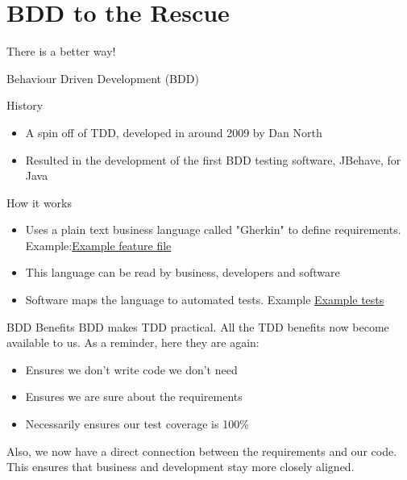 \documentclass[bigger]{beamer}
\begin{document}
\section{BDD to the Rescue}
\label{sec:org1af5abd}
\begin{frame}[label={sec:orgaa58640}]{There is a better way!}
\begin{block}{Behaviour Driven Development (BDD)}
\begin{block}{History}
\begin{itemize}
\item A spin off of TDD, developed in around 2009 by Dan North
\item Resulted in the development of the first BDD testing software, JBehave, for Java
\end{itemize}
\end{block}
\begin{block}{How it works}
\begin{itemize}
\item Uses a plain text business language called "Gherkin" to define requirements. Example:\href{calculator/arithmetic/features/arithmetic.feature}{Example feature file}
\item This language can be read by business, developers and software
\item Software maps the language to automated tests. Example \href{possible\_solution/tests.py}{Example tests}
\end{itemize}
\end{block}
\end{block}
\end{frame}
\begin{frame}[label={sec:orgc275b70}]{BDD Benefits}
BDD makes TDD practical. All the TDD benefits now become available to us.
As a reminder, here they are again:
\begin{itemize}
\item Ensures we don't write code we don't need
\item Ensures we are sure about the requirements
\item Necessarily ensures our test coverage is 100\%
\end{itemize}
Also, we now have a \alert{direct connection between the requirements and our code}. This ensures that business and development stay more closely aligned.
\end{frame}
\end{document}
